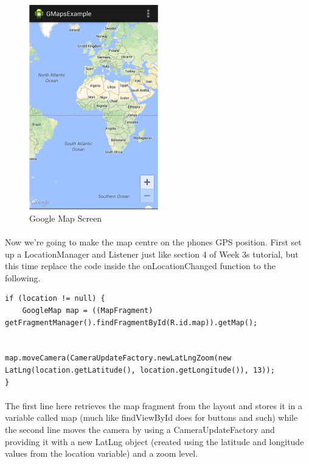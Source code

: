 \begin{figure}[H]%
\centering
\includegraphics[width=0.5\textwidth]{images/google-map-example}
\caption{Google Map Screen}
\label{fig:google-map-example}
\end{figure}

\paragraph{} Now we’re going to make the map centre on the phones GPS position.  First set up a LocationManager and Listener just like section 4 of Week 3s tutorial, but this time replace the code inside the onLocationChanged function to the following.

\begin{lstlisting}
if (location != null) {
	GoogleMap map = ((MapFragment) getFragmentManager().findFragmentById(R.id.map)).getMap();
					
					map.moveCamera(CameraUpdateFactory.newLatLngZoom(new LatLng(location.getLatitude(), location.getLongitude()), 13));
}
\end{lstlisting}

\paragraph{} The first line here retrieves the map fragment from the layout and stores it in a variable called map (much like findViewById does for buttons and such) while the second line moves the camera by using a CameraUpdateFactory and providing it with a new LatLng object (created using the latitude and longitude values from the location variable) and a zoom level.


